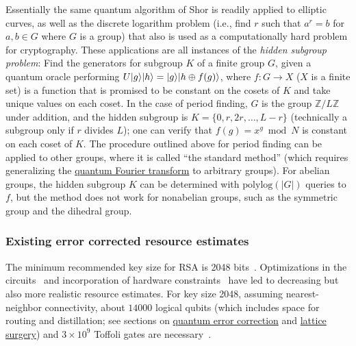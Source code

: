 \begin{refsection}
Essentially the same quantum algorithm of Shor is readily applied to elliptic curves, as well as the discrete logarithm problem (i.e., find $r$ such that $a^r=b$ for $a,b\in G$ where $G$ is a group) that also is used as a computationally hard problem for cryptography. 
These applications are all instances of the \emph{hidden subgroup problem}: Find the generators for subgroup $K$ of a finite group $G$, given a quantum oracle performing $U\lvert g\rangle\lvert h\rangle=\lvert g\rangle\lvert h \oplus f(g)\rangle$, where $f:G\to X$ ($X$ is a finite set) is a function that is promised to be constant on the cosets of $K$ and take unique values on each coset. In the case of period finding, $G$ is the group $\mathbb{Z}/L\mathbb{Z}$ under addition, and the hidden subgroup is $K = \{0,r,2r,\ldots,L-r\}$ (technically a subgroup only if $r$ divides $L$); one can verify that $f(g) = x^g \bmod N$ is constant on each coset of $K$. The procedure outlined above for period finding can be applied to other groups, where it is called ``the standard method'' \cite{childs2010QAlgosForAlgebraicProblems} (which requires generalizing the \hyperref[prim:QFT]{quantum Fourier transform} to arbitrary groups). For abelian groups, the hidden subgroup $K$ can be determined with $\mathrm{polylog}(|G|)$ queries to $f$, but the method does not work for nonabelian groups, such as the symmetric group and the dihedral group.


\subsubsection*{Existing error corrected resource estimates}

The minimum recommended key size for RSA is 2048 bits~\cite{barker2015KeyRecommendation}. Optimizations in the circuits~\cite{beauregard2003ShorCircuit,haner2017factoringToffolis} and incorporation of hardware constraints~\cite{fowler2012SurfaceCodes} have led to decreasing but also more realistic resource estimates. For key size 2048, assuming nearest-neighbor connectivity, about $14000$ logical qubits (which includes space for routing and distillation; see sections on \hyperref[prim:QEC]{quantum error correction} and \hyperref[prim:LatticeSurgery]{lattice surgery}) and $3\times 10^9$ Toffoli gates are necessary~\cite{gidney2021HowToFactor}. 


\end{refsection}
